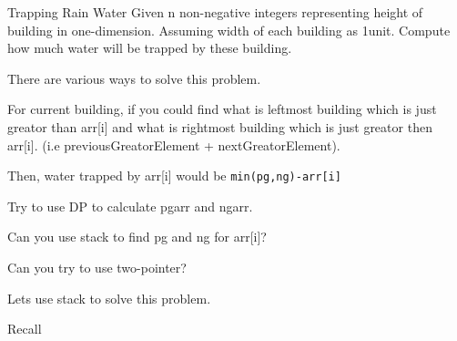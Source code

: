\begin{problem}{Trapping Rain Water}
    Given n non-negative integers representing height of building in one-dimension. Assuming width of each building as 1unit. Compute how much water will be trapped by these building.

\end{problem}

\begin{solution}
    There are various ways to solve this problem.

    \begin{guide}

        \item For current building, if you could find what is leftmost building which is just greator than arr[i] and what is rightmost building which is just greator then arr[i]. (i.e previousGreatorElement + nextGreatorElement).
        
        Then, water trapped by arr[i] would be \verb|min(pg,ng)-arr[i]|

        Try to use DP to calculate pgarr and ngarr.

        \item Can you use stack to find pg and ng for arr[i]?
        
        \item Can you try to use two-pointer?
    \end{guide}

\end{solution}

\begin{solution}[Stack | O(n)]
    Lets use stack to solve this problem.

    Recall
\end{solution}